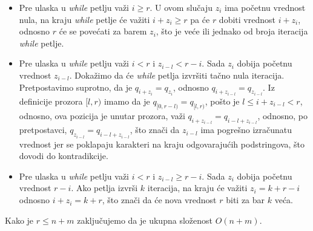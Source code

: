 \begin{itemize}
\item Pre ulaska u \textit{while} petlju va\v zi $i \geq r$. U ovom slu\v caju $z_i$ ima po\v cetnu vrednost nula, na kraju \textit{while} petlje \' ce va\v ziti $i + z_i \geq r$ pa \' ce $r$ dobiti vrednost $i + z_i$, odnosno $r$ \' ce se pove\' cati za barem $z_i$, \v sto je ve\'ce ili jednako od broja iteracija \textit{while} petlje.
\item Pre ulaska u \textit{while} petlju va\v zi $i < r$ i $z_{i-l} < r-i$. Sada $z_i$ dobija po\v cetnu vrednost $z_{i-l}$. Doka\v zimo da \' ce \textit{while} petlja izvr\v siti ta\v cno nula iteracija. Pretpostavimo suprotno, da je $q_{i+z_i} = q_{z_i}$, odnosno $q_{i+z_{i-l}} = q_{z_{i-l}}$. Iz definicije prozora $[l, r)$ imamo da je $q_{[0, r-l)} = q_{[l, r)}$, po\v sto je $l \leq i+z_{i-l} < r$, odnosno, ova pozicija je unutar prozora, va\v zi $q_{i+z_{i-l}} = q_{i-l+z_{i-l}}$, odnosno, po pretpostavci, $q_{z_{i-l}} = q_{i-l+z_{i-l}}$, \v sto zna\v ci da $z_{i-l}$ ima pogre\v sno izra\v cunatu vrednost jer se poklapaju karakteri na kraju odgovaraju\' cih podstringova, \v sto dovodi do kontradikcije.
\item Pre ulaska u \textit{while} petlju va\v zi $i < r$ i $z_{i-l} \geq r-i$. Sada $z_i$ dobija po\v cetnu vrednost $r-i$. Ako petlja izvr\v si $k$ iteracija, na kraju \' ce va\v ziti $z_i=k+r-i$ odnosno $i+z_i=k+r$, \v sto zna\v ci da \' ce nova vrednost $r$ biti za bar $k$ ve\' ca.
\end{itemize}

Kako je $r \leq n+m$ zaklju\v cujemo da je ukupna slo\v zenost $O(n+m)$.
